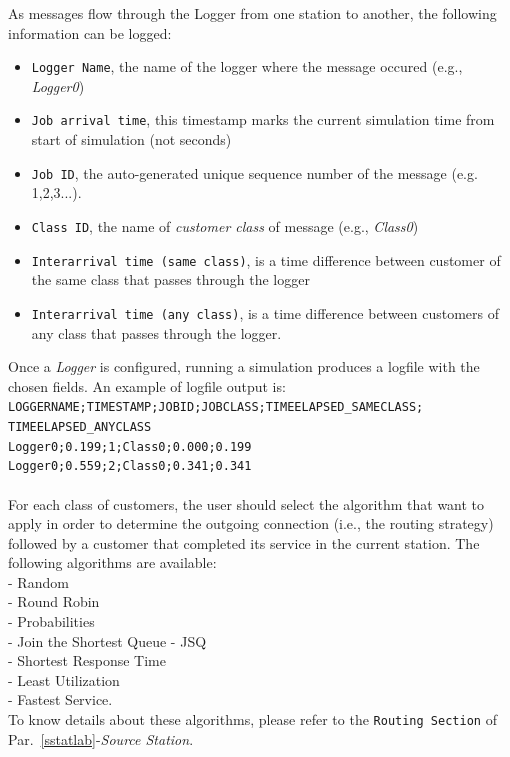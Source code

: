 As messages flow through the Logger from one station to another,
the following information can be logged:
\begin{itemize} \item \texttt{Logger Name}, the name of the logger
where the message occured (e.g., \emph{Logger0}) \item \texttt{Job
arrival time}, this timestamp marks the current simulation time
from start of simulation (not seconds) \item \texttt{Job ID}, the
auto-generated unique sequence number of the message (e.g.
1,2,3...). \item \texttt{Class ID}, the name of \emph{customer
class} of message (e.g., \emph{Class0}) \item \texttt{Interarrival
time (same class)}, is a time difference between customer of the
same class that passes through the logger \item
\texttt{Interarrival time (any class)}, is a time difference
between customers of any class that passes through the logger.
\end{itemize}

Once a \emph{Logger} is configured, running a simulation produces
a logfile with the chosen fields. An example
of logfile output is:\\
\texttt{LOGGERNAME;TIMESTAMP;JOBID;JOBCLASS;TIMEELAPSED\_SAMECLASS;
TIMEELAPSED\_ANYCLASS\\ Logger0;0.199;1;Class0;0.000;0.199\\
Logger0;0.559;2;Class0;0.341;0.341}\\

\\
For each class of customers, the user should select the algorithm
that want to apply in order to determine the outgoing connection
(i.e., the routing strategy) followed by a customer  that
completed its service in the current station.
The following algorithms are available:\\
- Random\\ - Round Robin\\ - Probabilities\\ - Join the Shortest Queue - JSQ\\
- Shortest Response Time\\ - Least Utilization\\ - Fastest Service.\\
To know details about these algorithms, please refer to the
\texttt{Routing Section} of Par.~\ref{sstatlab}-\emph{Source
Station}.


